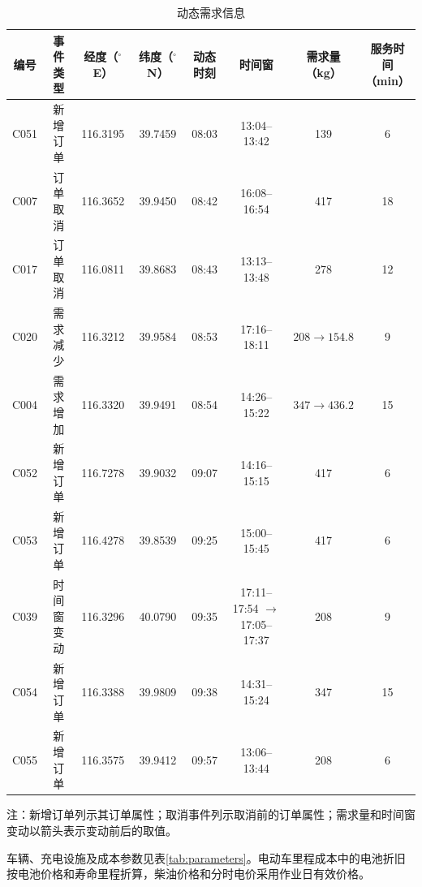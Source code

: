 \documentclass{setp-new}
\begin{document}
\begin{table}[H]
\centering
\caption{动态需求信息}
\label{tab:dynamic-nodes}
\small
\renewcommand{\arraystretch}{0.90}
\setlength{\tabcolsep}{1.0pt}
\begin{tabular*}{\textwidth}{@{\extracolsep{\fill}}cccccccc@{}}
\toprule
编号 & 事件类型 & 经度（$^{\circ}$E） & 纬度（$^{\circ}$N） & 动态时刻 & 时间窗 & \makecell{需求量\\（kg）} & \makecell{服务时间\\（min）}\\
\midrule
C051 & 新增订单 & 116.3195 & 39.7459 & 08:03 & 13:04--13:42 & 139 & 6\\
C007 & 订单取消 & 116.3652 & 39.9450 & 08:42 & 16:08--16:54 & 417 & 18\\
C017 & 订单取消 & 116.0811 & 39.8683 & 08:43 & 13:13--13:48 & 278 & 12\\
C020 & 需求减少 & 116.3212 & 39.9584 & 08:53 & 17:16--18:11 & $208\rightarrow154.8$ & 9\\
C004 & 需求增加 & 116.3320 & 39.9491 & 08:54 & 14:26--15:22 & $347\rightarrow436.2$ & 15\\
C052 & 新增订单 & 116.7278 & 39.9032 & 09:07 & 14:16--15:15 & 417 & 6\\
C053 & 新增订单 & 116.4278 & 39.8539 & 09:25 & 15:00--15:45 & 417 & 6\\
C039 & 时间窗变动 & 116.3296 & 40.0790 & 09:35 & \makecell{17:11--17:54\\$\rightarrow$17:05--17:37} & 208 & 9\\
C054 & 新增订单 & 116.3388 & 39.9809 & 09:38 & 14:31--15:24 & 347 & 15\\
C055 & 新增订单 & 116.3575 & 39.9412 & 09:57 & 13:06--13:44 & 208 & 6\\
\bottomrule
\end{tabular*}
\vspace{2pt}
\parbox{\textwidth}{\footnotesize 注：新增订单列示其订单属性；取消事件列示取消前的订单属性；需求量和时间窗变动以箭头表示变动前后的取值。}
\end{table}

车辆、充电设施及成本参数见表\ref{tab:parameters}。电动车里程成本中的电池折旧按电池价格和寿命里程折算\cite{ref:27}，柴油价格和分时电价采用作业日有效价格。
\end{document}
